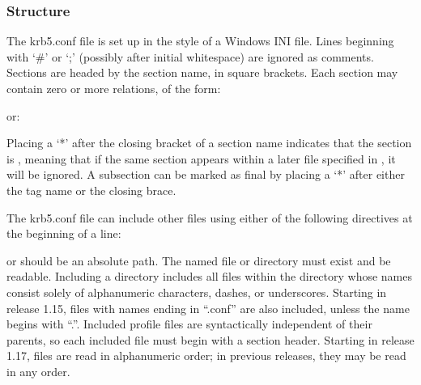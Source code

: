 \documentclass[letterpaper,10pt,english]{sphinxmanual}
\begin{document}
\subsubsection{Structure}
\label{\detokenize{admin/conf_files/krb5_conf:structure}}
\sphinxAtStartPar
The krb5.conf file is set up in the style of a Windows INI file.
Lines beginning with ‘\#’ or ‘;’ (possibly after initial whitespace)
are ignored as comments.  Sections are headed by the section name, in
square brackets.  Each section may contain zero or more relations, of
the form:

\begin{sphinxVerbatim}[commandchars=\\\{\}]
  
\end{sphinxVerbatim}

\sphinxAtStartPar
or:

\begin{sphinxVerbatim}[commandchars=\\\{\}]
  
      
      
\end{sphinxVerbatim}

\sphinxAtStartPar
Placing a ‘*’ after the closing bracket of a section name indicates
that the section is , meaning that if the same section appears
within a later file specified in , it will be ignored.
A subsection can be marked as final by placing a ‘*’ after either the
tag name or the closing brace.

\sphinxAtStartPar
The krb5.conf file can include other files using either of the
following directives at the beginning of a line:

\begin{sphinxVerbatim}[commandchars=\\\{\}]
 
 
\end{sphinxVerbatim}

\sphinxAtStartPar
{} or  should be an absolute path. The named file or
directory must exist and be readable.  Including a directory includes
all files within the directory whose names consist solely of
alphanumeric characters, dashes, or underscores.  Starting in release
1.15, files with names ending in “.conf” are also included, unless the
name begins with “.”.  Included profile files are syntactically
independent of their parents, so each included file must begin with a
section header.  Starting in release 1.17, files are read in
alphanumeric order; in previous releases, they may be read in any
order.
\end{document}
